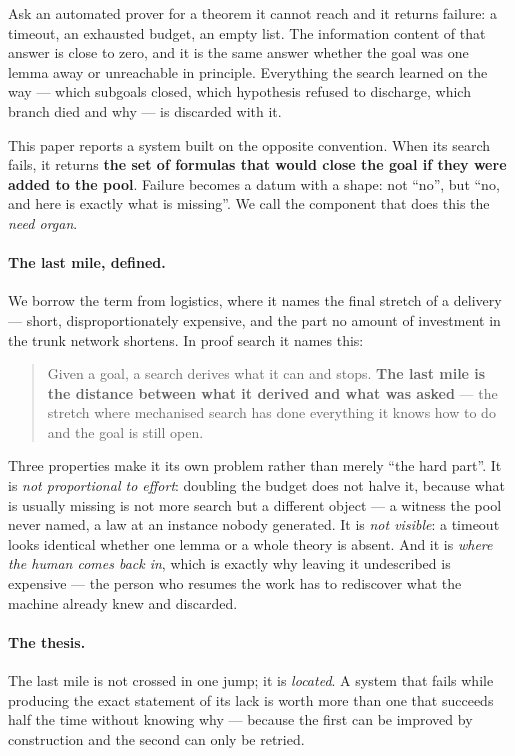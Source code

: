 \documentclass[11pt]{article}
\theoremstyle{remark}\newtheorem{remark}{Remark}
\begin{document}
Ask an automated prover for a theorem it cannot reach and it returns failure: a timeout,
an exhausted budget, an empty list. The information content of that answer is close to
zero, and it is the same answer whether the goal was one lemma away or unreachable in
principle. Everything the search learned on the way --- which subgoals closed, which
hypothesis refused to discharge, which branch died and why --- is discarded with it.

This paper reports a system built on the opposite convention. When its search fails, it
returns \textbf{the set of formulas that would close the goal if they were added to the
pool}. Failure becomes a datum with a shape: not ``no'', but ``no, and here is exactly
what is missing''. We call the component that does this the \emph{need organ}.

\paragraph{The last mile, defined.} We borrow the term from logistics, where it names the
final stretch of a delivery --- short, disproportionately expensive, and the part no
amount of investment in the trunk network shortens. In proof search it names this:

\begin{quote}
Given a goal, a search derives what it can and stops. \textbf{The last mile is the
distance between what it derived and what was asked} --- the stretch where mechanised
search has done everything it knows how to do and the goal is still open.
\end{quote}

Three properties make it its own problem rather than merely ``the hard part''. It is
\emph{not proportional to effort}: doubling the budget does not halve it, because what
is usually missing is not more search but a different object --- a witness the pool never
named, a law at an instance nobody generated. It is \emph{not visible}: a timeout looks
identical whether one lemma or a whole theory is absent. And it is \emph{where the human
comes back in}, which is exactly why leaving it undescribed is expensive --- the person
who resumes the work has to rediscover what the machine already knew and discarded.

\paragraph{The thesis.} The last mile is not crossed in one jump; it is \emph{located}.
A system that fails while producing the exact statement of its lack is worth more than
one that succeeds half the time without knowing why --- because the first can be
improved by construction and the second can only be retried.
\end{document}
